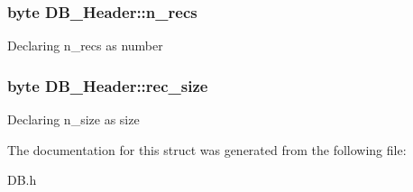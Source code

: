 \subsubsection[{n\+\_\+recs}]{\setlength{\rightskip}{0pt plus 5cm}byte D\+B\+\_\+\+Header\+::n\+\_\+recs}\label{struct_d_b___header_a8cca2e4c4f81d4eab5fb7eb53716a10b}
Declaring n\+\_\+recs as number \hypertarget{struct_d_b___header_a47a513477cb101a6e44cc75eb497506d}{}
\subsubsection[{rec\+\_\+size}]{\setlength{\rightskip}{0pt plus 5cm}byte D\+B\+\_\+\+Header\+::rec\+\_\+size}\label{struct_d_b___header_a47a513477cb101a6e44cc75eb497506d}
Declaring n\+\_\+size as size 

The documentation for this struct was generated from the following file\+:\begin{DoxyCompactItemize}
\item 
D\+B.\+h\end{DoxyCompactItemize}
